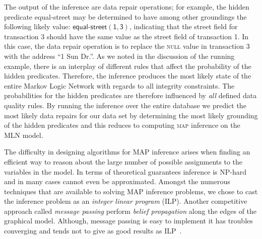 The output of the inference are data repair operations; for example, the hidden predicate \textsf{equal-street} may be determined to have among other groundings the following likely value: $\mathsf{\textsf{equal-street}(1, 3)}$, indicating that the \textsf{street} field for transaction 3 should have the same value as the \textsf{street} field of transaction 1. In this case, the data repair operation is to replace the \textsc{null} value in transaction 3 with the address ``1 Sun Dr.''. As we noted in the discussion of the running example, there is an interplay of different rules that affect the probability of the hidden predicates. Therefore, the inference produces the most likely state of the entire Markov Logic Network with regards to all integrity constraints. The probabilities for the hidden predicates are therefore influenced by \textit{all} defined data quality rules. By running the inference over the entire database we predict the most likely data repairs for our data set by determining the most likely grounding of the hidden predicates and this reduces to computing \textsc{map} inference on the MLN model.      

The difficulty in designing algorithms for MAP inference arises when finding an efficient way to reason about the large number of possible assignments to the variables in the model. In terms of theoretical guarantees inference is NP-hard and in many cases cannot even be approximated. Amongst the numerous techniques that are available to solving MAP inference problems, we chose to cast the inference problem as an \emph{integer linear program} (ILP). Another competitive approach called \emph{message passing} perform \emph{belief propagation} along the edges of the graphical model. Although, message passing is easy to implement it has troubles converging \cite{schwing2011distributed, felzenszwalb2006efficient, pritch2009shift} and tends not to give as good results as ILP~\cite{NoessnerNS13}. %
  

